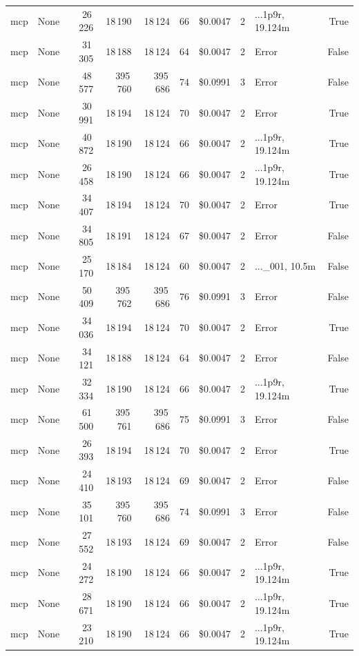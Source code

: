\documentclass[a4paper,11pt]{article}
\begin{document}
\begin{table}[H]
{\begin{tabular}{l r r r r r r r l r}
mcp & None & 26\,226 & 18\,190 & 18\,124 & 66 & \$0.0047 & 2 & ...1p9r, 19.124m & True \\
mcp & None & 31\,305 & 18\,188 & 18\,124 & 64 & \$0.0047 & 2 & Error & False \\
mcp & None & 48\,577 & 395\,760 & 395\,686 & 74 & \$0.0991 & 3 & Error & False \\
mcp & None & 30\,991 & 18\,194 & 18\,124 & 70 & \$0.0047 & 2 & Error & True \\
mcp & None & 40\,872 & 18\,190 & 18\,124 & 66 & \$0.0047 & 2 & ...1p9r, 19.124m & True \\
mcp & None & 26\,458 & 18\,190 & 18\,124 & 66 & \$0.0047 & 2 & ...1p9r, 19.124m & True \\
mcp & None & 34\,407 & 18\,194 & 18\,124 & 70 & \$0.0047 & 2 & Error & True \\
mcp & None & 34\,805 & 18\,191 & 18\,124 & 67 & \$0.0047 & 2 & Error & False \\
mcp & None & 25\,170 & 18\,184 & 18\,124 & 60 & \$0.0047 & 2 & ...\_001, 10.5m & False \\
mcp & None & 50\,409 & 395\,762 & 395\,686 & 76 & \$0.0991 & 3 & Error & False \\
mcp & None & 34\,036 & 18\,194 & 18\,124 & 70 & \$0.0047 & 2 & Error & True \\
mcp & None & 34\,121 & 18\,188 & 18\,124 & 64 & \$0.0047 & 2 & Error & False \\
mcp & None & 32\,334 & 18\,190 & 18\,124 & 66 & \$0.0047 & 2 & ...1p9r, 19.124m & True \\
mcp & None & 61\,500 & 395\,761 & 395\,686 & 75 & \$0.0991 & 3 & Error & False \\
mcp & None & 26\,393 & 18\,194 & 18\,124 & 70 & \$0.0047 & 2 & Error & True \\
mcp & None & 24\,410 & 18\,193 & 18\,124 & 69 & \$0.0047 & 2 & Error & False \\
mcp & None & 35\,101 & 395\,760 & 395\,686 & 74 & \$0.0991 & 3 & Error & False \\
mcp & None & 27\,552 & 18\,193 & 18\,124 & 69 & \$0.0047 & 2 & Error & False \\
mcp & None & 24\,272 & 18\,190 & 18\,124 & 66 & \$0.0047 & 2 & ...1p9r, 19.124m & True \\
mcp & None & 28\,671 & 18\,190 & 18\,124 & 66 & \$0.0047 & 2 & ...1p9r, 19.124m & True \\
mcp & None & 23\,210 & 18\,190 & 18\,124 & 66 & \$0.0047 & 2 & ...1p9r, 19.124m & True \\

\end{tabular}}
\end{table}
\end{document}
